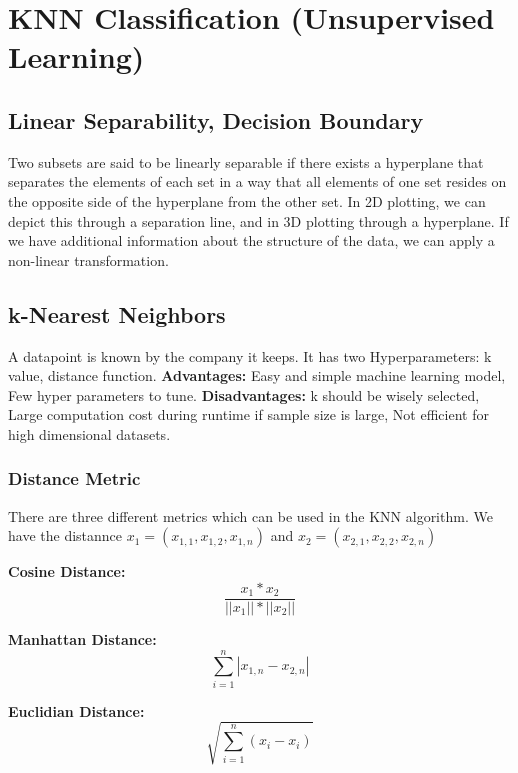 \section{KNN Classification (Unsupervised Learning)}
\subsection{Linear Separability, Decision Boundary}
Two subsets are said to be linearly separable if there exists a hyperplane that separates the elements of each set in a way that all elements of one set resides on the opposite side of the hyperplane from the other set. In 2D plotting, we can depict this through a separation line, and in 3D plotting through a hyperplane. If we have additional information about the structure of the data, we can apply a non-linear transformation.

\subsection{k-Nearest Neighbors}
A datapoint is known by the company it keeps. It has two Hyperparameters: k value, distance function. \textbf{Advantages:} Easy and simple machine learning model,  Few  hyper parameters to tune. \textbf{Disadvantages:} k should be wisely selected,  Large computation cost during runtime if sample size is large, Not efficient for high dimensional datasets.

\subsubsection{Distance Metric}
There are three different metrics which can be used in the KNN algorithm. We have the distannce $x_{1}=(x_{1,1},x_{1,2},x_{1,n})$ and $x_{2}=(x_{2,1},x_{2,2},x_{2,n})$

\begin{minipage}{0,3\linewidth}
	\textbf{Cosine Distance:} 
\[ \frac{x_{1}*x_{2}}{||x_{1}||*||x_{2}||} \] 	 
\end{minipage}
\begin{minipage}{0,3\linewidth}
	\textbf{Manhattan Distance:} 
	\[ \sum_{i=1}^{n} |x_{1,n} - x_{2,n}|\]  
\end{minipage}
\begin{minipage}{0,5\linewidth}
	\textbf{Euclidian Distance:}
 \[ \sqrt{\sum_{i=1}^n (x_{i} - x_{i})} \]  
\end{minipage}



 
 
 
 
 
 
